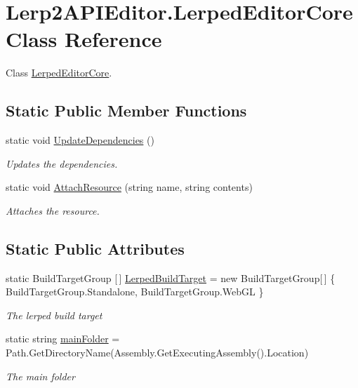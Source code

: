 \hypertarget{class_lerp2_a_p_i_editor_1_1_lerped_editor_core}{}\section{Lerp2\+A\+P\+I\+Editor.\+Lerped\+Editor\+Core Class Reference}
\label{class_lerp2_a_p_i_editor_1_1_lerped_editor_core}


Class \hyperlink{class_lerp2_a_p_i_editor_1_1_lerped_editor_core}{Lerped\+Editor\+Core}.  


\subsection*{Static Public Member Functions}
\begin{DoxyCompactItemize}
\item 
static void \hyperlink{class_lerp2_a_p_i_editor_1_1_lerped_editor_core_afb029bab4edc9ae082b183370403e3c6}{Update\+Dependencies} ()
\begin{DoxyCompactList}\small\item\em Updates the dependencies. \end{DoxyCompactList}\item 
static void \hyperlink{class_lerp2_a_p_i_editor_1_1_lerped_editor_core_af596bafdf9567527184224681f6f6907}{Attach\+Resource} (string name, string contents)
\begin{DoxyCompactList}\small\item\em Attaches the resource. \end{DoxyCompactList}\end{DoxyCompactItemize}
\subsection*{Static Public Attributes}
\begin{DoxyCompactItemize}
\item 
static Build\+Target\+Group \mbox{[}$\,$\mbox{]} \hyperlink{class_lerp2_a_p_i_editor_1_1_lerped_editor_core_a010a0b96c2e9029eea1ab28b56f9686e}{Lerped\+Build\+Target} = new Build\+Target\+Group\mbox{[}$\,$\mbox{]} \{ Build\+Target\+Group.\+Standalone, Build\+Target\+Group.\+Web\+GL \}
\begin{DoxyCompactList}\small\item\em The lerped build target \end{DoxyCompactList}\item 
static string \hyperlink{class_lerp2_a_p_i_editor_1_1_lerped_editor_core_aae797b81cb9e4bc1f42b9046f1e1759c}{main\+Folder} = Path.\+Get\+Directory\+Name(Assembly.\+Get\+Executing\+Assembly().Location)
\begin{DoxyCompactList}\small\item\em The main folder \end{DoxyCompactList}\end{DoxyCompactItemize}
